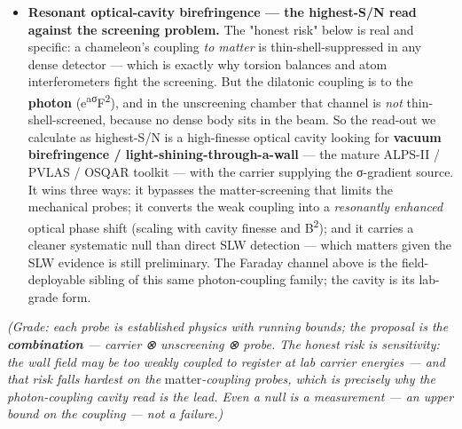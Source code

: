 \documentclass[11pt]{article}
\begin{document}
\begin{itemize}
\item \textbf{Resonant optical-cavity birefringence --- the highest-S/N read against the screening problem.} The "honest risk" below is real and specific: a chameleon's coupling \emph{to matter} is thin-shell-suppressed in any dense detector --- which is exactly why torsion balances and atom interferometers fight the screening. But the dilatonic coupling is to the \textbf{photon} (e\textsuperscript{aσ}F\textsuperscript{2}), and in the unscreening chamber that channel is \emph{not} thin-shell-screened, because no dense body sits in the beam. So the read-out we calculate as highest-S/N is a high-finesse optical cavity looking for \textbf{vacuum birefringence / light-shining-through-a-wall} --- the mature ALPS-II / PVLAS / OSQAR toolkit --- with the carrier supplying the σ-gradient source. It wins three ways: it bypasses the matter-screening that limits the mechanical probes; it converts the weak coupling into a \emph{resonantly enhanced} optical phase shift (scaling with cavity finesse and B\textsuperscript{2}); and it carries a cleaner systematic null than direct SLW detection --- which matters given the SLW evidence is still preliminary. The Faraday channel above is the field-deployable sibling of this same photon-coupling family; the cavity is its lab-grade form.
\end{itemize}

\emph{(Grade: each probe is established physics with running bounds; the proposal is the \textbf{combination} --- carrier ⊗ unscreening ⊗ probe. The honest risk is sensitivity: the wall field may be too weakly coupled to register at lab carrier energies --- and that risk falls hardest on the }matter\emph{-coupling probes, which is precisely why the photon-coupling cavity read is the lead. Even a null is a measurement --- an upper bound on the coupling --- not a failure.)}
\end{document}
